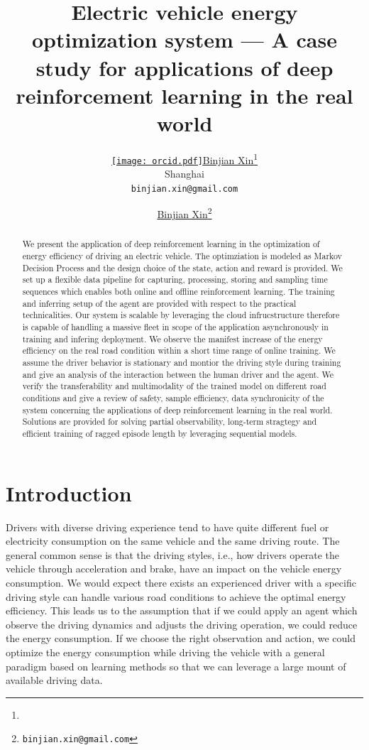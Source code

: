 \documentclass{article}
\title{Electric vehicle energy optimization system --- A case study for applications of deep reinforcement learning in the real world}
\author{ \href{https://orcid.org/0009-0003-0705-2612}{\texttt{[image: orcid.pdf]}\hspace{1mm}Binjian Xin}\thanks{} \\
	Shanghai\\
	\texttt{binjian.xin@gmail.com} \\
}
\author[1]{%
	\href{https://orcid.org/0009-0003-0705-2612}{\usebox{\orcid}\hspace{1mm}Binjian Xin\thanks{\texttt{binjian.xin@gmail.com}}}%
}
\affil[1]{}
\begin{document}
\maketitle

\begin{abstract}
	We present the application of deep reinforcement learning in the optimization of energy efficiency of driving an electric vehicle. The optimziation is modeled as Markov Decision Process and the design choice of the state, action and reward is provided. We set up a flexible data pipeline for capturing, processing, storing and sampling time sequences which enables both online and offline reinforcement learning. The training and inferring setup of the agent are provided with respect to the practical technicalities. Our system is scalable by leveraging the cloud infrucstructure therefore is capable of handling a massive fleet in scope of the application asynchronously in training and infering deployment. We observe the manifest increase of the energy efficiency on the real road condition within a short time range of online training. We assume the driver behavior is stationary and montior the driving style during training and give an analysis of the interaction between the human driver and the agent. We verify the transferability and multimodality of the trained model on different road conditions and give a review of safety, sample efficiency, data synchronicity of the system concerning the applications of deep reinforcement learning in the real world. Solutions are provided for solving partial observability, long-term stragtegy and efficient training of ragged episode length by leveraging sequential models.
\end{abstract}



\section{Introduction}
\label{sec:intro}

Drivers with diverse driving experience tend to have quite different fuel or electricity consumption on the same vehicle and the same driving route. The general common sense is that the driving styles, i.e., how drivers operate the vehicle through acceleration and brake, have an impact on the vehicle energy consumption. We would expect there exists an experienced driver with a specific driving style can handle various road conditions to achieve the optimal energy efficiency. This leads us to the assumption that if we could apply an agent which observe the driving dynamics and adjusts the driving operation, we could reduce the energy consumption. If we choose the right observation and action, we could optimize the energy consumption while driving the vehicle with a general paradigm based on learning methods so that we can leverage a large mount of available driving data.
\end{document}
